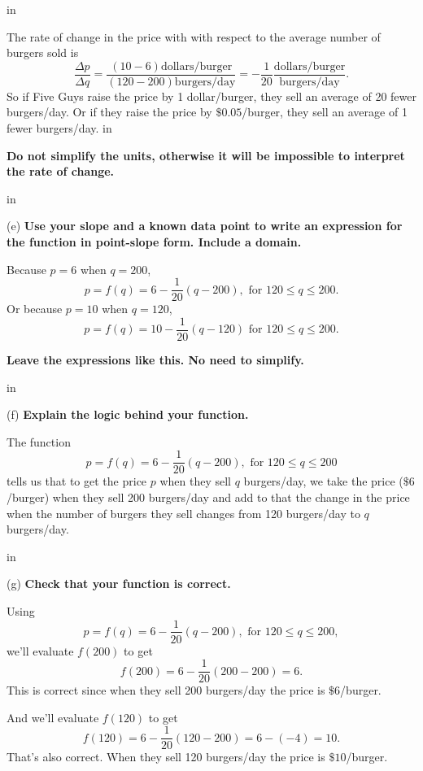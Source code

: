 \documentclass{ximera}
\newcommand{\pskip}{\vskip 0.1 in}
\begin{document}
\begin{example}
\begin{explanation}
\pskip

The rate of change in the price with with respect to the average number of burgers sold is
\[
   \frac{\Delta p}{\Delta q} = \frac{(10-6) \text{dollars/burger}}{(120-200) \text{burgers/day}} = -\frac{1}{20} \frac{\text{dollars/burger}}{\text{burgers/day} } .
\]
So if Five Guys raise the price by 1 dollar/burger, they sell an average of 20 fewer burgers/day. Or if they raise the price by $\$0.05$/burger, they sell an average of 1 fewer burgers/day.
\pskip

{\bf Do not simplify the units, otherwise it will be impossible to interpret the rate of change.}

\pskip

(e) {\bf Use your slope and a known data point to write an expression for the function in point-slope form. Include a domain.}

Because $p=6$ when $q=200$, 
\[
  p = f(q) = 6 - \frac{1}{20} \left( q - 200 \right) , \text{ for } 120\leq q \leq 200 . 
\]
Or  because $p=10$ when $q=120$, 
\[
  p = f(q) = 10 - \frac{1}{20} \left( q - 120 \right) \text{ for } 120\leq q \leq 200.
\]
\end{explanation}
{\bf Leave the expressions like this. No need to simplify.}

\pskip 

(f) {\bf Explain the logic behind your function.}

The function
\[
   p = f(q) = 6 - \frac{1}{20} \left( q - 200 \right) , \text{ for } 120\leq q \leq 200
\]
tells us that to get the price $p$ when they sell $q$ burgers/day, we take the price ($\$6$/burger) when they sell 200 burgers/day and add to that the change in the price when the number of burgers they sell changes from 120 burgers/day to $q$  burgers/day.

\pskip

(g) {\bf Check that your function is correct.}

Using
\[
  p = f(q) = 6 - \frac{1}{20} \left( q - 200 \right) , \text{ for } 120\leq q \leq 200 , 
\]
we'll evaluate $f(200)$ to get
\[
    f(200) = 6 - \frac{1}{20} \left( 200 - 200 \right) =6 .
\]
This is correct since when they sell 200 burgers/day the price is $\$6$/burger.

And we'll evaluate $f(120)$ to get
\[
  f(120) = 6 - \frac{1}{20} \left( 120 - 200 \right)  = 6 - (-4) = 10 .
\]
That's also correct. When they sell 120 burgers/day the price is $\$10$/burger.


\end{example}
\end{document}

